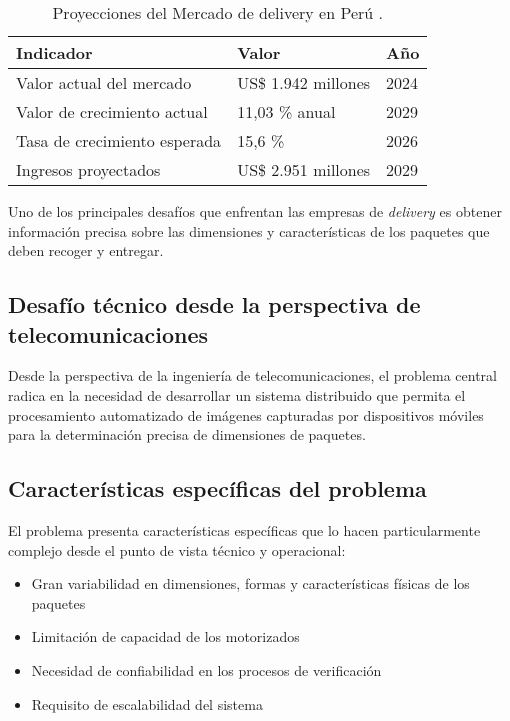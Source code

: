 \begin{table}[H]
\centering
\caption{Proyecciones del Mercado de delivery en Perú \cite{WebRef13249}.}
\label{tab:proyecciones_delivery}
\begin{tabular}{@{}p{5.5cm}p{3.5cm}p{2cm}@{}}
\toprule
\textbf{Indicador} & \textbf{Valor} & \textbf{Año} \\
\midrule
Valor actual del mercado & US\$ 1.942 millones & 2024 \\
\addlinespace
Valor de crecimiento actual & 11,03 \% anual & 2029 \\
\addlinespace
Tasa de crecimiento esperada & 15,6 \% & 2026 \\
\addlinespace
Ingresos proyectados & US\$ 2.951 millones & 2029 \\
\bottomrule
\end{tabular}
\end{table}

Uno de los principales desafíos que enfrentan las empresas de \textit{delivery} es obtener información precisa sobre las dimensiones y características de los paquetes que deben recoger y entregar.

\subsection{Desafío técnico desde la perspectiva de telecomunicaciones}

Desde la perspectiva de la ingeniería de telecomunicaciones, el problema central radica en la necesidad de desarrollar un sistema distribuido que permita el procesamiento automatizado de imágenes capturadas por dispositivos móviles para la determinación precisa de dimensiones de paquetes.

\subsection{Características específicas del problema}

El problema presenta características específicas que lo hacen particularmente complejo desde el punto de vista técnico y operacional:

\begin{itemize}
    \item Gran variabilidad en dimensiones, formas y características físicas de los paquetes
    \item Limitación de capacidad de los motorizados
    \item Necesidad de confiabilidad en los procesos de verificación
    \item Requisito de escalabilidad del sistema
\end{itemize}

